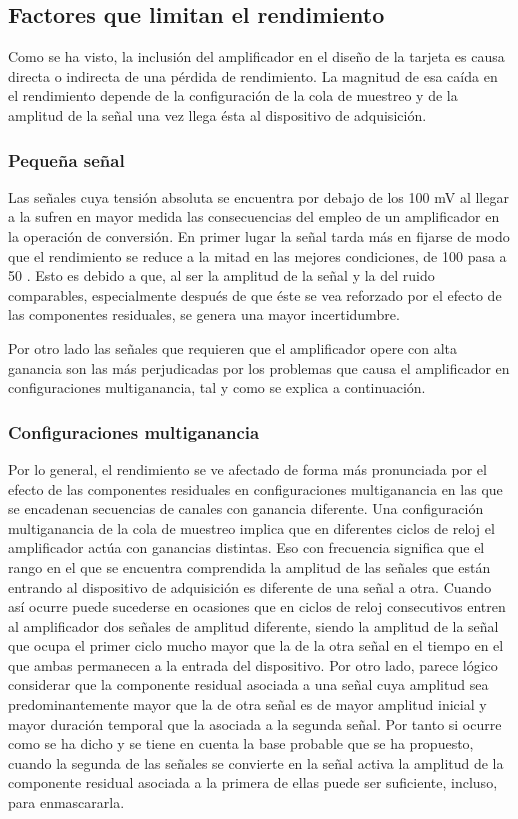 \subsection{Factores que limitan el rendimiento}

Como se ha visto, la inclusión del amplificador en el diseño de la tarjeta
es causa directa o indirecta de una pérdida de rendimiento. La magnitud de
esa caída en el rendimiento depende de la configuración de la cola de
muestreo y de la amplitud de la señal una vez llega ésta al dispositivo de
adquisición.

\subsubsection{Pequeña señal}

Las señales cuya tensión absoluta se encuentra por debajo de los 100 mV al
llegar a la \kpci{} sufren en mayor medida las consecuencias del empleo de
un amplificador en la operación de conversión. En primer lugar la señal
tarda más en fijarse de modo que el rendimiento se reduce a la mitad en las
mejores condiciones, de 100 \kms{} pasa a 50 \kms{}. Esto es debido a que,
al ser la amplitud de la señal y la del ruido comparables, especialmente
después de que éste se vea reforzado por el efecto de las componentes
residuales, se genera una mayor incertidumbre.

Por otro lado las señales que requieren que el amplificador opere con alta
ganancia son las más perjudicadas por los problemas que causa el
amplificador en configuraciones multiganancia, tal y como se explica a
continuación.


\subsubsection{Configuraciones multiganancia}

Por lo general, el rendimiento se ve afectado de forma más pronunciada por
el efecto de las componentes residuales en configuraciones multiganancia en
las que se encadenan secuencias de canales con ganancia diferente. Una
configuración multiganancia de la cola de muestreo implica que en
diferentes ciclos de reloj el amplificador actúa con ganancias distintas.
Eso con frecuencia significa que el rango en el que se encuentra
comprendida la amplitud de las señales que están entrando al dispositivo de
adquisición es diferente de una señal a otra. Cuando así ocurre puede
sucederse en ocasiones que en ciclos de reloj consecutivos entren al
amplificador dos señales de amplitud diferente, siendo la amplitud de la
señal que ocupa el primer ciclo mucho mayor que la de la otra señal en el
tiempo en el que ambas permanecen a la entrada del dispositivo. Por otro
lado, parece lógico considerar que la componente residual asociada a una
señal cuya amplitud sea predominantemente mayor que la de otra señal es de
mayor amplitud inicial y mayor duración temporal que la asociada a la
segunda señal. Por tanto si ocurre como se ha dicho y se tiene en cuenta la
base probable que se ha propuesto, cuando la segunda de las señales se
convierte en la señal activa la amplitud de la componente residual asociada
a la primera de ellas puede ser suficiente, incluso, para enmascararla.

